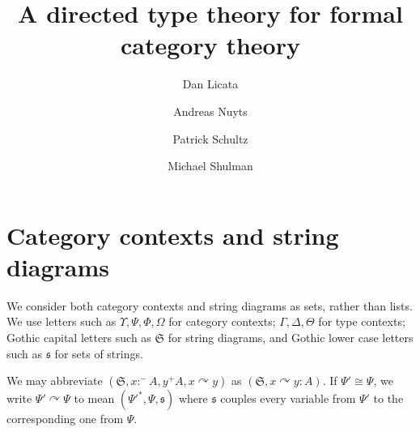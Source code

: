 \documentclass{article}
\title{A directed type theory for formal category theory}
\author{Dan Licata \and Andreas Nuyts \and Patrick Schultz \and Michael Shulman}
\def\p{^+} %
\def\m{^-}
\def\cat{\;\mathsf{cat}}
\def\flip#1{#1^*} %
\newcommand{\catctx}{\;\mathsf{catctx}}
\newcommand{\sdiag}{\;\mathsf{sdiag}}
\newcommand{\strs}[1]{\mathfrak{#1}}
\newcommand{\strto}{\curvearrowright}
\begin{document}
\maketitle

\section{Category contexts and string diagrams}
We consider both category contexts and string diagrams as sets, rather than lists. We use letters such as $\Upsilon, \Psi, \Phi, \Omega$ for category contexts; $\Gamma, \Delta, \Theta$ for type contexts; Gothic capital letters such as $\strs S$ for string diagrams, and Gothic lower case letters such as $\strs s$ for sets of strings.


We may abbreviate $(\strs S, x :\m A, y \p A, x \strto y)$ as $(\strs S, x \strto y : A)$. If $\Psi' \cong \Psi$, we write $\Psi' \strto \Psi$ to mean $(\flip{{\Psi'}}, \Psi, \strs s)$ where $\strs s$ couples every variable from $\Psi'$ to the corresponding one from $\Psi$.
\end{document}
